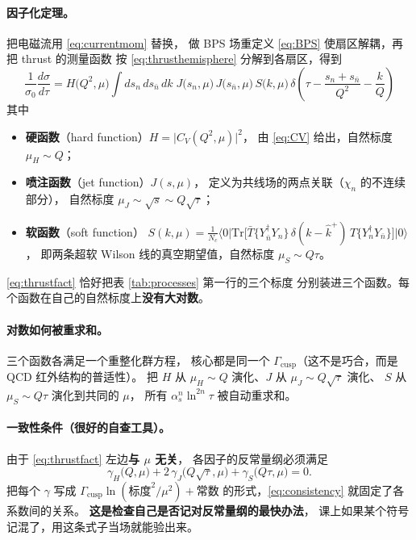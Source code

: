 \documentclass[UTF8,a4paper,11pt]{ctexart}
\theoremstyle{definition}
\theoremstyle{remark}
\theoremstyle{plain}
\newcommand{\as}{\alpha_s}
\newcommand{\Gcusp}{\Gamma_{\mathrm{cusp}}}
\newcommand{\en}[1]{\textsf{#1}}   %
\newcommand{\Tr}{\mathrm{Tr}}
\begin{document}
\paragraph{因子化定理。}把电磁流用 \eqref{eq:currentmom} 替换，
做 BPS 场重定义 \eqref{eq:BPS} 使扇区解耦，再把 thrust 的测量函数
按 \eqref{eq:thrusthemisphere} 分解到各扇区，得到
\begin{equation}
  \boxed{\;
  \frac{1}{\sigma_0}\frac{d\sigma}{d\tau}
  = H\big(Q^2,\mu\big)\!\int\! ds_n\,ds_{\bar n}\,dk\;
    J\big(s_n,\mu\big)\,J\big(s_{\bar n},\mu\big)\,S\big(k,\mu\big)\,
    \delta\!\left(\tau-\frac{s_n+s_{\bar n}}{Q^2}-\frac{k}{Q}\right)\;}
  \label{eq:thrustfact}
\end{equation}
其中
\begin{itemize}
  \item \textbf{硬函数}（\en{hard function}）$H=\big|C_V(Q^2,\mu)\big|^2$，
        由 \eqref{eq:CV} 给出，自然标度 $\mu_H\sim Q$；
  \item \textbf{喷注函数}（\en{jet function}）$J(s,\mu)$，
        定义为共线场的两点关联（$\chi_n$ 的不连续部分），
        自然标度 $\mu_J\sim\sqrt{s}\sim Q\sqrt\tau$；
  \item \textbf{软函数}（\en{soft function}）
        $S(k,\mu)=\frac{1}{N_c}\big\langle 0\big|
        \Tr\big[\bar T\{Y_{\bar n}^\dagger Y_n\}\,\delta(k-\hat k^+)\,
        T\{Y_n^\dagger Y_{\bar n}\}\big]\big|0\big\rangle$，
        即两条超软 Wilson 线的真空期望值，自然标度 $\mu_S\sim Q\tau$。
\end{itemize}

\eqref{eq:thrustfact} 恰好把表 \ref{tab:processes} 第一行的三个标度
分别装进三个函数。每个函数在自己的自然标度上\textbf{没有大对数}。

\paragraph{对数如何被重求和。}三个函数各满足一个重整化群方程，
核心都是同一个 $\Gcusp$（这不是巧合，而是 QCD 红外结构的普适性）。
把 $H$ 从 $\mu_H\sim Q$ 演化、$J$ 从 $\mu_J\sim Q\sqrt\tau$ 演化、
$S$ 从 $\mu_S\sim Q\tau$ 演化到共同的 $\mu$，
所有 $\as^n\ln^{2n}\tau$ 被自动重求和。

\paragraph{一致性条件（很好的自查工具）。}
由于 \eqref{eq:thrustfact} 左边\textbf{与 $\mu$ 无关}，
各因子的反常量纲必须满足
\begin{equation}
  \gamma_H\big(Q,\mu\big)
  +2\,\gamma_J\big(Q\sqrt\tau,\mu\big)
  +\gamma_S\big(Q\tau,\mu\big)=0 .
  \label{eq:consistency}
\end{equation}
把每个 $\gamma$ 写成 $\Gcusp\ln(\text{标度}^2/\mu^2)+\text{常数}$
的形式，\eqref{eq:consistency} 就固定了各系数间的关系。
\textbf{这是检查自己是否记对反常量纲的最快办法}，
课上如果某个符号记混了，用这条式子当场就能验出来。
\end{document}
